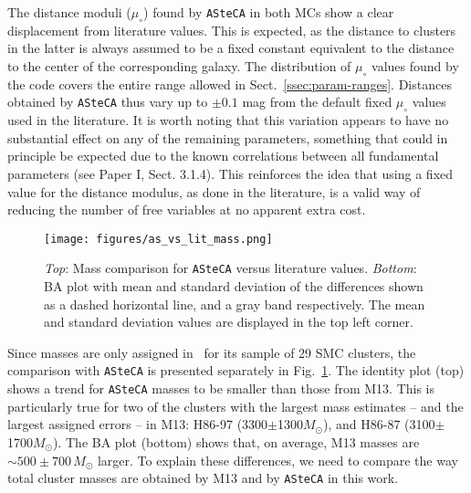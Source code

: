 \documentclass[draft]{aa}
\begin{document}
The distance moduli ($\mu_{\circ}$) found by \texttt{ASteCA} in both MCs
show a clear displacement from literature values. This is expected, as the
distance to clusters in the latter is always assumed to be a fixed constant
equivalent to the distance to the center of the corresponding galaxy.
The distribution of $\mu_{\circ}$ values found by the code covers the entire
range allowed in Sect.~\ref{ssec:param-ranges}. Distances obtained by
\texttt{ASteCA} thus vary up to ${\pm}0.1$ mag from the default fixed
$\mu_{\circ}$ values used in the literature.
%
It is worth noting that this variation appears to have no substantial effect on
any of the remaining parameters, something that could in principle be expected
due to the known correlations between all fundamental parameters (see Paper I,
Sect. 3.1.4).
This reinforces the idea that using a fixed value for the distance modulus, as
done in the literature, is a valid way of reducing the number of free variables
at no apparent extra cost.\\

\begin{figure}
\centering
\texttt{[image: figures/as\_vs\_lit\_mass.png]}
\caption{\emph{Top}: Mass comparison for \texttt{ASteCA} versus literature
values.
\emph{Bottom}: BA plot with mean and standard deviation of the differences
shown as a dashed horizontal line, and a gray band respectively. The mean and
standard deviation values are displayed in the top left corner.}
\label{fig:as_vs_lit_mass}
\end{figure}

Since masses are only assigned in~\citet[][M13]{Maia_2013} for its sample of 29
SMC clusters, the comparison with \texttt{ASteCA} is presented separately in
Fig.~\ref{fig:as_vs_lit_mass}.
%
The identity plot (top) shows a trend for \texttt{ASteCA} masses to be smaller
than those from M13. This is particularly true for two of the clusters with
the largest mass estimates -- and the largest assigned errors -- in M13:
H86-97 (3300$\pm$1300$M_{\odot}$), and H86-87
(3100$\pm$1700$M_{\odot}$). The BA plot (bottom) shows that, on average, M13
masses are ${\sim}500{\pm}700\,M_{\odot}$ larger.
%
To explain these differences, we need to compare the way total cluster masses
are obtained by M13 and by \texttt{ASteCA} in this work.
\end{document}
